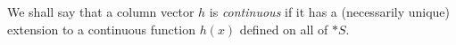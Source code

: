 We shall say that a column vector $h$ is \emph{continuous} if it has a (necessarily unique) extension to a continuous function $h(x)$ defined on all of $*S$.
